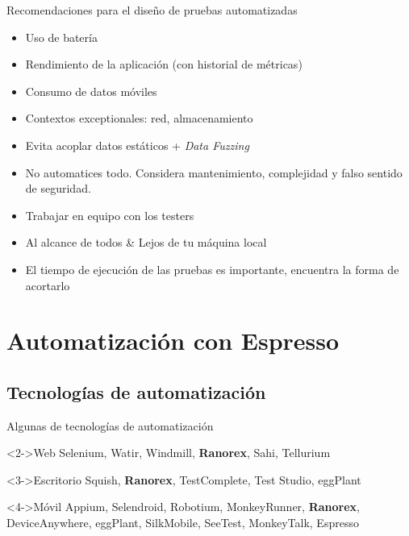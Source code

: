 \documentclass[pdf]
{beamer}
\begin{document}
	\begin{frame}{Recomendaciones para el dise\~no de pruebas automatizadas}
	  \begin{itemize}
	    \item<2-> Uso de bater\'ia
	    \item<3-> Rendimiento de la aplicaci\'on (con historial de m\'etricas)
	    \item<4-> Consumo de datos m\'oviles
	    \item<5-> Contextos exceptionales: red, almacenamiento
	    \item<6-> Evita acoplar datos est\'aticos + \textit{Data Fuzzing}
	    \item<7-> No automatices todo. Considera mantenimiento, complejidad y falso sentido de seguridad. 
	    \item<8-> Trabajar en equipo con los testers
	    \item<9-> Al alcance de todos \& Lejos de tu m\'aquina local
	    \item<10-> El tiempo de ejecuci\'on de las pruebas es importante, encuentra la forma de acortarlo

	  \end{itemize}

	\end{frame}
        
    
    \section{Automatizaci\'on con Espresso}
    \subsection{Tecnolog\'ias de automatizaci\'on}
    \begin{frame}{Algunas de tecnolog\'ias de automatizaci\'on}
        \begin{block}<2->{Web}
	    Selenium, Watir, Windmill, \textbf{Ranorex}, Sahi, Tellurium 
	\end{block}
	\begin{block}<3->{Escritorio}
	    Squish, \textbf{Ranorex}, TestComplete, Test Studio, eggPlant
	\end{block}
	\begin{block}<4->{M\'ovil}
	    Appium, Selendroid, Robotium, MonkeyRunner, \textbf{Ranorex}, DeviceAnywhere, eggPlant, SilkMobile, SeeTest, MonkeyTalk, Espresso
	\end{block}

    \end{frame}
    
\end{document}
